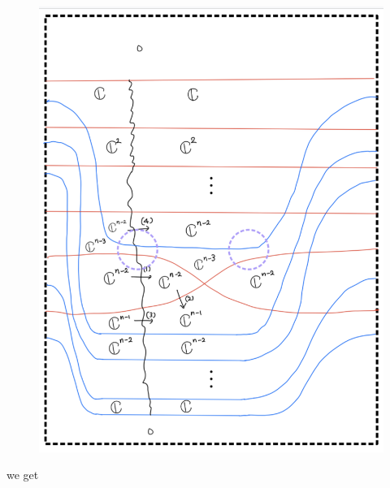 \begin{enumerate}[label = (\roman*)]
\begin{enumerate}[label = (Case \arabic*)]
\begin{enumerate}[label = (Step \arabic*)]
\begin{figure}[H]
    \centering
    \includegraphics[scale = 0.95]{diagrams/cobord_gen/16.png}
    \caption{}
    \label{fig:your-label}
\end{figure}

we get


\end{enumerate}
\end{enumerate}
\end{enumerate}
